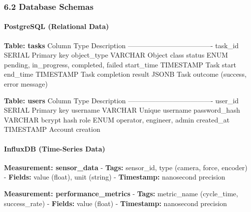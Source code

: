 \documentclass[
]{article}
\begin{document}
\hypertarget{database-schemas}{%
\subsubsection{6.2 Database Schemas}\label{database-schemas}}

\hypertarget{postgresql-relational-data}{%
\paragraph{PostgreSQL (Relational
Data)}\label{postgresql-relational-data}}

\textbf{Table: tasks} \textbar{} Column \textbar{} Type \textbar{}
Description \textbar{}
\textbar--------------\textbar-----------\textbar-------------\textbar{}
\textbar{} task\_id \textbar{} SERIAL \textbar{} Primary key \textbar{}
\textbar{} object\_type \textbar{} VARCHAR \textbar{} Object class
\textbar{} \textbar{} status \textbar{} ENUM \textbar{} pending,
in\_progress, completed, failed \textbar{} \textbar{} start\_time
\textbar{} TIMESTAMP \textbar{} Task start \textbar{} \textbar{}
end\_time \textbar{} TIMESTAMP \textbar{} Task completion \textbar{}
\textbar{} result \textbar{} JSONB \textbar{} Task outcome (success,
error message) \textbar{}

\textbf{Table: users} \textbar{} Column \textbar{} Type \textbar{}
Description \textbar{}
\textbar--------------\textbar-----------\textbar-------------\textbar{}
\textbar{} user\_id \textbar{} SERIAL \textbar{} Primary key \textbar{}
\textbar{} username \textbar{} VARCHAR \textbar{} Unique username
\textbar{} \textbar{} password\_hash\textbar{} VARCHAR \textbar{} bcrypt
hash \textbar{} \textbar{} role \textbar{} ENUM \textbar{} operator,
engineer, admin \textbar{} \textbar{} created\_at \textbar{} TIMESTAMP
\textbar{} Account creation \textbar{}

\hypertarget{influxdb-time-series-data}{%
\paragraph{InfluxDB (Time-Series
Data)}\label{influxdb-time-series-data}}

\textbf{Measurement: sensor\_data} - \textbf{Tags:} sensor\_id, type
(camera, force, encoder) - \textbf{Fields:} value (float), unit (string)
- \textbf{Timestamp:} nanosecond precision

\textbf{Measurement: performance\_metrics} - \textbf{Tags:} metric\_name
(cycle\_time, success\_rate) - \textbf{Fields:} value (float) -
\textbf{Timestamp:} nanosecond precision
\end{document}
